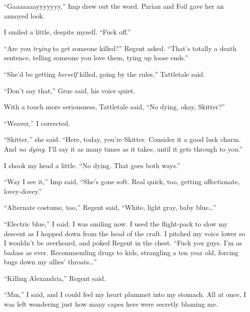 ``Gaaaaaaayyyyyyy,'' Imp drew out the word.  Parian and Foil gave her an annoyed look.



I smiled a little, despite myself.  ``Fuck off.''



``Are you \emph{trying} to get someone killed?'' Regent asked.  ``That's totally a death sentence, telling someone you love them, tying up loose ends.''



``She'd be getting \emph{herself} killed, going by the rules,'' Tattletale said.



``Don't say that,'' Grue said, his voice quiet.



With a touch more seriousness, Tattletale said, ``No dying, okay, Skitter?''



``Weaver,'' I corrected.



``Skitter,'' she said.  ``Here, today, you're Skitter.  Consider it a good luck charm.  And \emph{no dying}.  I'll say it as many times as it takes, until it gets through to you.''



I shook my head a little.  ``No dying.  That goes both ways.''



``Way I see it,'' Imp said, ``She's gone soft.  Real quick, too, getting affectionate, lovey-dovey.''



``Alternate costume, too,'' Regent said, ``White, light gray, baby blue\ldots''



``Electric blue,'' I said.  I was smiling now.  I used the flight-pack to slow my descent as I hopped down from the head of the craft.  I pitched my voice lower so I wouldn't be overheard, and poked Regent in the chest.  ``Fuck you guys.  I'm as badass as ever.  Recommending drugs to kids, strangling a ten year old, forcing bugs down my allies' throats\ldots''



``Killing Alexandria,'' Regent said.



``Mm,'' I said, and I could feel my heart plummet into my stomach.  All at once, I was left wondering just how many capes here were secretly blaming me.




